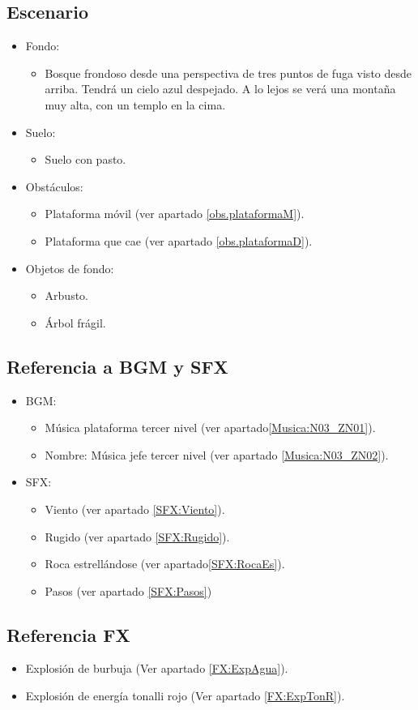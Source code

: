 \subsection{Escenario}
\begin{itemize} 
	\item Fondo:
\begin{itemize}
	\item Bosque frondoso desde una perspectiva de tres puntos de fuga visto desde arriba. Tendrá un cielo azul despejado. A lo lejos se verá una montaña muy alta, con un templo en la cima.
\end{itemize}
	\item Suelo:
		\begin{itemize}
			\item Suelo con pasto.
		\end{itemize}
	\item Obstáculos:
		\begin{itemize}
			\item Plataforma móvil (ver apartado \ref{obs.plataformaM}).
			\item Plataforma que cae (ver apartado \ref{obs.plataformaD}).
		\end{itemize}
	\item Objetos de fondo:
		\begin{itemize}
			\item Arbusto.
			\item Árbol frágil.
		\end{itemize}
\end{itemize}	
	\subsection{Referencia a BGM y SFX}
\begin{itemize}
	\item BGM:
		\begin{itemize}
			\item Música plataforma tercer nivel (ver apartado\ref{Musica:N03_ZN01}).
			\item Nombre: Música jefe tercer nivel (ver apartado \ref{Musica:N03_ZN02}).
		\end{itemize}
	\item SFX:
		\begin{itemize}
			\item Viento (ver apartado \ref{SFX:Viento}).
			\item Rugido (ver apartado \ref{SFX:Rugido}).
			\item Roca estrellándose (ver apartado\ref{SFX:RocaEs}).
			\item Pasos (ver apartado \ref{SFX:Pasos})
		\end{itemize}
\end{itemize} 
	\subsection{Referencia FX}
\begin{itemize}
	\item Explosión de burbuja (Ver apartado \ref{FX:ExpAgua}).
	\item Explosión de energía tonalli rojo (Ver apartado \ref{FX:ExpTonR}).
\end{itemize}